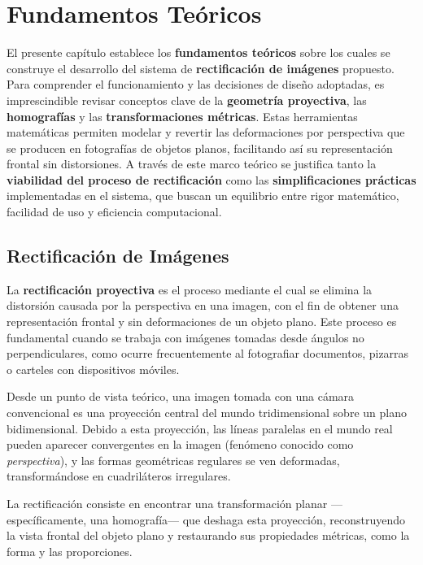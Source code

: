 
\chapter{Fundamentos Teóricos}
\label{ch:fundamentos}

El presente capítulo establece los \textbf{fundamentos teóricos} sobre los cuales se construye el desarrollo del sistema de \textbf{rectificación de imágenes} propuesto. Para comprender el funcionamiento y las decisiones de diseño adoptadas, es imprescindible revisar conceptos clave de la \textbf{geometría proyectiva}, las \textbf{homografías} y las \textbf{transformaciones métricas}. Estas herramientas matemáticas permiten modelar y revertir las deformaciones por perspectiva que se producen en fotografías de objetos planos, facilitando así su representación frontal sin distorsiones. A través de este marco teórico se justifica tanto la \textbf{viabilidad del proceso de rectificación} como las \textbf{simplificaciones prácticas} implementadas en el sistema, que buscan un equilibrio entre rigor matemático, facilidad de uso y eficiencia computacional.


\section{Rectificación de Imágenes}

La \textbf{rectificación proyectiva} es el proceso mediante el cual se elimina la distorsión causada por la perspectiva en una imagen, con el fin de obtener una representación frontal y sin deformaciones de un objeto plano. Este proceso es fundamental cuando se trabaja con imágenes tomadas desde ángulos no perpendiculares, como ocurre frecuentemente al fotografiar documentos, pizarras o carteles con dispositivos móviles.

Desde un punto de vista teórico, una imagen tomada con una cámara convencional es una proyección central del mundo tridimensional sobre un plano bidimensional. Debido a esta proyección, las líneas paralelas en el mundo real pueden aparecer convergentes en la imagen (fenómeno conocido como \textit{perspectiva}), y las formas geométricas regulares se ven deformadas, transformándose en cuadriláteros irregulares.

La rectificación consiste en encontrar una transformación planar —específicamente, una homografía— que deshaga esta proyección, reconstruyendo la vista frontal del objeto plano y restaurando sus propiedades métricas, como la forma y las proporciones.

